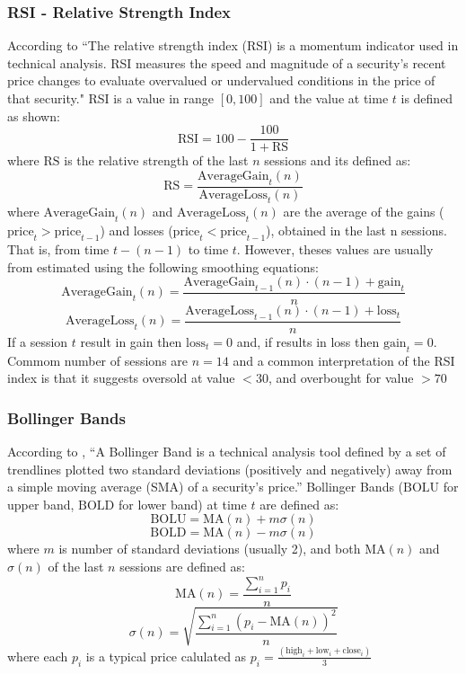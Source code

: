\documentclass{article}
\begin{document}
\subsubsection*{RSI - Relative Strength Index}
According to \cite{rsi} ``The relative strength index (RSI) is a momentum indicator used in technical analysis. 
RSI measures the speed and magnitude of a security's recent price changes to evaluate overvalued or 
undervalued conditions in the price of that security."
RSI is a value in range $[0, 100]$ and the value at time $t$ is defined as \cite{rodrigo} shown:
$$
    \text{RSI} = 100 - \frac{100}{1 + \text{RS}}
$$
where $\text{RS}$ is the relative strength of the last $n$ sessions and its defined as:
$$
    \text{RS} = \frac{\text{AverageGain}_t(n)}{\text{AverageLoss}_t(n)}
$$
where $\text{AverageGain}_t(n)$ and $\text{AverageLoss}_t(n)$ are the average of the gains ($\text{price}_t > \text{price}_{t-1}$) 
and losses ($\text{price}_t < \text{price}_{t-1}$), obtained in the last n sessions. That is, from time $t - (n - 1)$ to time $t$. 
However, theses values are usually from estimated using the following smoothing equations:
$$
    \text{AverageGain}_t(n) = \frac{\text{AverageGain}_{t-1}(n) \cdot (n-1) + \text{gain}_t}{n}
$$ 
$$
    \text{AverageLoss}_t(n) = \frac{\text{AverageLoss}_{t-1}(n) \cdot (n-1) + \text{loss}_t}{n}
$$ 
If a session $t$ result in gain then $\text{loss}_t = 0$ and, if results in loss then $\text{gain}_t = 0$. Commom number of sessions
are $n = 14$ and a common interpretation of the RSI index is that it suggests oversold at value $< 30$, and overbought for value $ > 70$ 

\subsubsection*{Bollinger Bands}
According to \cite{bb}, ``A Bollinger Band is a technical analysis tool defined by a set of trendlines plotted two standard deviations
(positively and negatively) away from a simple moving average (SMA) of a security's price.'' 
Bollinger Bands ($\text{BOLU}$ for upper band, $\text{BOLD}$ for lower band) at time $t$ are defined as:
$$
\text{BOLU} = \text{MA}(n) + m\sigma(n)
$$
$$
\text{BOLD} = \text{MA}(n) - m\sigma(n)
$$
where $m$ is number of standard deviations (usually 2), and both $\text{MA}(n)$ and $\sigma(n)$ of the last $n$ sessions are defined as:
$$
\text{MA}(n) = \frac{\sum_{i = 1}^{n}{p_i}}{n}
$$
$$
\sigma(n) = \sqrt{\frac{\sum_{i = 1}^{n}{(p_i - \text{MA}(n))^2}}{n}}
$$
where each $p_i$ is a typical price calulated as $p_i = \frac{(\text{high}_i + \text{low}_i + \text{close}_i)}{3}$
\end{document}
